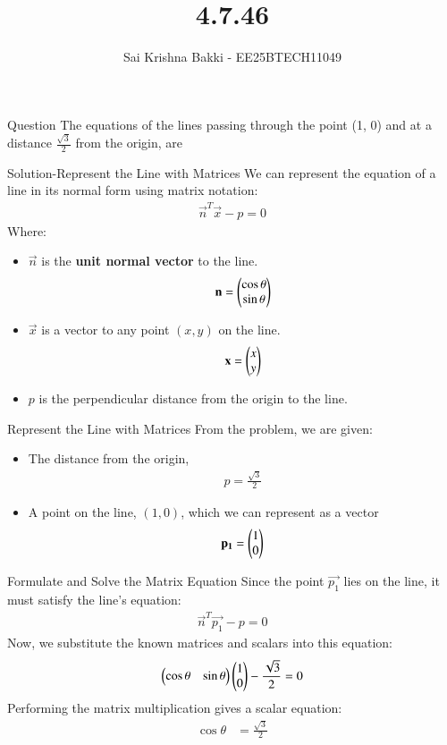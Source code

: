 \documentclass{beamer}
\title %
{4.7.46}
\date{}
\author %
{Sai Krishna Bakki - EE25BTECH11049}
\begin{document}
\frame{\titlepage}
\begin{frame}{Question}
The equations of the lines passing through the point (1, 0) and at a distance $\frac{\sqrt{3}}{2}$ from the origin, are
\end{frame}
\begin{frame}{Solution-Represent the Line with Matrices}
We can represent the equation of a line in its normal form using matrix notation:
\begin{align}
\vec{n}^T \vec{x} - p = 0
\end{align} 
Where:
\begin{itemize}
    \item $\vec{n}$ is the \textbf{unit normal vector} to the line. \begin{align}\mathbf{n} = \begin{pmatrix}\cos\theta \\ \sin\theta\end{pmatrix}\end{align} 
    \item $\vec{x}$ is a vector to any point $(x, y)$ on the line. \begin{align}\mathbf{x} = \begin{pmatrix}x \\ y\end{pmatrix}\end{align} 
    \item $p$ is the perpendicular distance from the origin to the line.
\end{itemize}
\end{frame}
\begin{frame}{Represent the Line with Matrices}
From the problem, we are given:
\begin{itemize}
    \item The distance from the origin, \begin{align}p = \frac{\sqrt{3}}{2}\end{align} 
    \item A point on the line, $(1, 0)$, which we can represent as a vector \begin{align}\mathbf{p_1} = \begin{pmatrix}1 \\ 0\end{pmatrix}\end{align} 
\end{itemize}
\end{frame}
\begin{frame}{Formulate and Solve the Matrix Equation}
    Since the point $\vec{p_1}$ lies on the line, it must satisfy the line's equation:
\begin{align}\vec{n}^T \vec{p_1} - p = 0\end{align}
Now, we substitute the known matrices and scalars into this equation:
\begin{align}
\begin{pmatrix}\cos\theta & \sin\theta \end{pmatrix} \begin{pmatrix}1 \\ 0\end{pmatrix} - \frac{\sqrt{3}}{2} = 0 \end{align}
Performing the matrix multiplication gives a scalar equation:
\begin{align}
\cos\theta &= \frac{\sqrt{3}}{2}
\end{align}
\end{frame}
\end{document}
